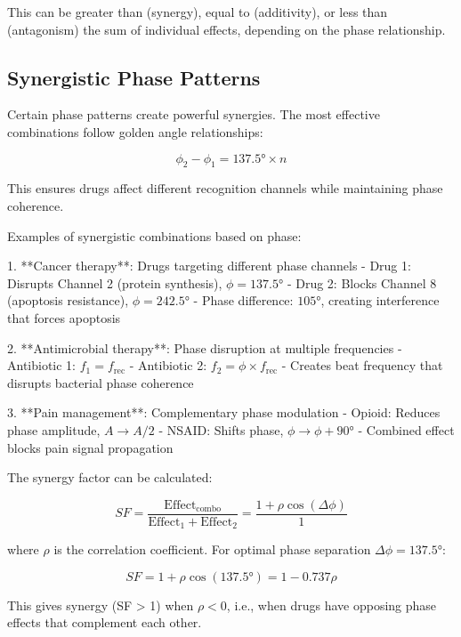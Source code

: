 \documentclass[12pt,a4paper]{report}
\begin{document}
This can be greater than (synergy), equal to (additivity), or less than (antagonism) the sum of individual effects, depending on the phase relationship.

\subsection{Synergistic Phase Patterns}

Certain phase patterns create powerful synergies. The most effective combinations follow golden angle relationships:

\begin{equation}
\phi_2 - \phi_1 = 137.5° \times n
\end{equation}

This ensures drugs affect different recognition channels while maintaining phase coherence.

Examples of synergistic combinations based on phase:

1. **Cancer therapy**: Drugs targeting different phase channels
   - Drug 1: Disrupts Channel 2 (protein synthesis), $\phi = 137.5°$
   - Drug 2: Blocks Channel 8 (apoptosis resistance), $\phi = 242.5°$
   - Phase difference: $105°$, creating interference that forces apoptosis

2. **Antimicrobial therapy**: Phase disruption at multiple frequencies
   - Antibiotic 1: $f_1 = f_{\text{rec}}$
   - Antibiotic 2: $f_2 = \phi \times f_{\text{rec}}$
   - Creates beat frequency that disrupts bacterial phase coherence

3. **Pain management**: Complementary phase modulation
   - Opioid: Reduces phase amplitude, $A \to A/2$
   - NSAID: Shifts phase, $\phi \to \phi + 90°$
   - Combined effect blocks pain signal propagation

The synergy factor can be calculated:

\begin{equation}
SF = \frac{\text{Effect}_{\text{combo}}}{\text{Effect}_1 + \text{Effect}_2} = \frac{1 + \rho \cos(\Delta\phi)}{1}
\end{equation}

where $\rho$ is the correlation coefficient. For optimal phase separation $\Delta\phi = 137.5°$:

\begin{equation}
SF = 1 + \rho \cos(137.5°) = 1 - 0.737\rho
\end{equation}

This gives synergy (SF > 1) when $\rho < 0$, i.e., when drugs have opposing phase effects that complement each other.
\end{document}
